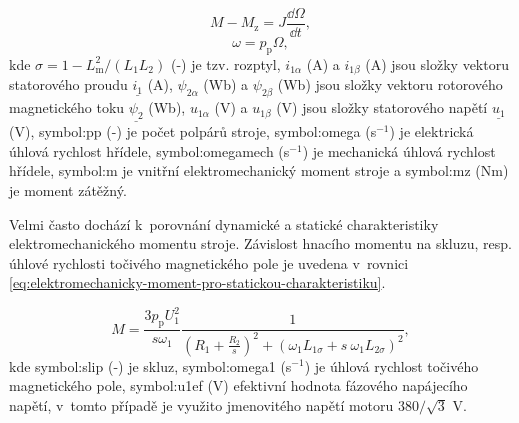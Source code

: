 \documentclass[a4paper, twoside, 11pt]{article}
\begin{document}
\begin{equation}
    M - M_\text{z} = J \frac{\dd{\Omega}}{\dd{t}},
\end{equation}
\begin{equation}
    \omega = p_\text{p} \Omega,
\end{equation}
kde $\sigma = 1 - L_\text{m}^{2}/(L_1 L_2)$ (-) je tzv. rozptyl, $i_{1\alpha}$ (A) a $i_{1\beta}$ (A) jsou složky vektoru statorového proudu $\underline{i_1}$ (A), $\psi_{2\alpha}$ (Wb) a $\psi_{2\beta}$ (Wb) jsou složky vektoru rotorového magnetického toku $\underline{\psi_2}$ (Wb), $u_{1\alpha}$ (V) a $u_{1\beta}$ (V) jsou složky statorového napětí $\underline{u_1}$ (V), \gls{symbol:pp} (-) je počet polpárů stroje, \gls{symbol:omega} (s$^{-1}$) je elektrická úhlová rychlost hřídele, \gls{symbol:omegamech} (s$^{-1}$) je mechanická úhlová rychlost hřídele, \gls{symbol:m} je vnitřní elektromechanický moment stroje a \gls{symbol:mz} (Nm) je moment zátěžný.\par

Velmi často dochází k~porovnání dynamické a statické charakteristiky elektromechanického momentu stroje. Závislost hnacího momentu na skluzu, resp. úhlové rychlosti točivého magnetického pole je uvedena v~rovnici \ref{eq:elektromechanicky-moment-pro-statickou-charakteristiku}.

 \begin{equation}\label{eq:elektromechanicky-moment-pro-statickou-charakteristiku}
            M = \frac{3 p_\text{p} U_\text{1}^{2}}{s \omega_1} \frac{1}{(R_1 + \frac{R_2}{s})^{2} + (\omega_1 L_{1\sigma} + s~\omega_1 L_{2\sigma})^{2}},
        \end{equation}
        kde \gls{symbol:slip} (-) je skluz, \gls{symbol:omega1} (s$^{-1}$) je úhlová rychlost točivého magnetického pole, \gls{symbol:u1ef} (V) efektivní hodnota fázového napájecího napětí, v~tomto případě je využito jmenovitého napětí motoru $380/\sqrt{3}$ V.
\end{document}
